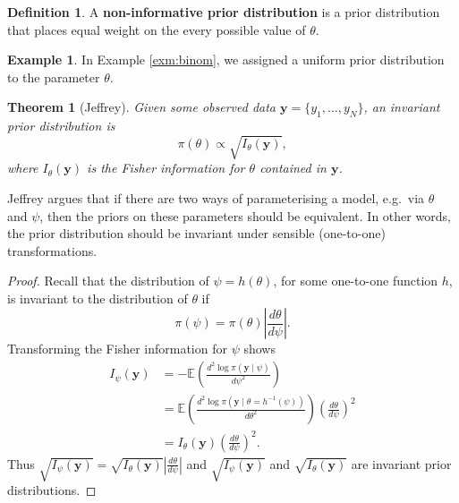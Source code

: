 \documentclass[
]{book}
\newtheorem{theorem}{Theorem}[chapter]
\theoremstyle{definition}
\newtheorem{definition}{Definition}[chapter]
\theoremstyle{definition}
\newtheorem{example}{Example}[chapter]
\theoremstyle{definition}
\theoremstyle{definition}
\theoremstyle{remark}
\begin{document}
\begin{definition}
A \textbf{non-informative prior distribution} is a prior distribution that places equal weight on the every possible value of \(\theta\).
\end{definition}

\begin{example}
In Example \ref{exm:binom}, we assigned a uniform prior distribution to the parameter \(\theta\).
\end{example}

\begin{theorem}[Jeffrey]
Given some observed data \(\boldsymbol{y} = \{y_1, \ldots, y_N\}\), an invariant prior distribution is
\[
\pi(\theta) \propto \sqrt{I_\theta(\boldsymbol{y})},
\]
where \(I_\theta(\boldsymbol{y})\) is the Fisher information for \(\theta\) contained in \(\boldsymbol{y}\).
\end{theorem}

Jeffrey argues that if there are two ways of parameterising a model, e.g.~via \(\theta\) and \(\psi\), then the priors on these parameters should be equivalent. In other words, the prior distribution should be invariant under sensible (one-to-one) transformations.

\begin{proof}
Recall that the distribution of \(\psi = h(\theta)\), for some one-to-one function \(h\), is invariant to the distribution of \(\theta\) if
\[
\pi(\psi) = \pi(\theta) \left|\frac{d\theta}{d\psi}\right|.
\]
Transforming the Fisher information for \(\psi\) shows
\begin{align*}
I_\psi(\boldsymbol{y}) &= - \mathbb{E}\left(\frac{d^2\log \pi(\boldsymbol{y} \mid \psi)}{d\psi^2}\right) \\
& = \mathbb{E}\left(\frac{d^2 \log \pi(\boldsymbol{y} \mid \theta = h^{-1}(\psi))}{d\theta^2}\right) \left(\frac{d\theta}{d\psi}\right)^2 \\
& = I_\theta(\boldsymbol{y})\left(\frac{d\theta}{d\psi}\right)^2 .
\end{align*}
Thus \(\sqrt{I_\psi(\boldsymbol{y})} = \sqrt{I_\theta(\boldsymbol{y})} \left|\frac{d\theta}{d\psi}\right|\) and \(\sqrt{I_\psi(\boldsymbol{y})}\) and \(\sqrt{I_\theta(\boldsymbol{y})}\) are invariant prior distributions.
\end{proof}
\end{document}

